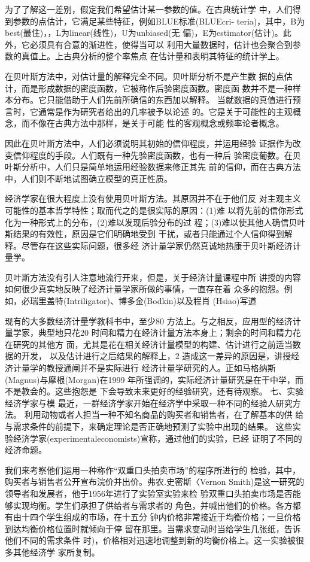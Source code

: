 为了了解这一差别，假定我们希望估计某一参数的值。在古典统计学
中，人们得到参数的点估计，它满足某些特征，例如BLUE标准(BLUEcri-
teria)，其中，B为best(最住)，，L为linear(线性)，U为unbiased(无
偏)，E为estimator(估计)。此外，它必须具有合意的渐进性，使得当可以
利用大量数据时，估计也会聚合到参数的真值上。上古典分析的整个率焦点
在估计量和表明其特征的统计学上。

在贝叶斯方法中，对估计量的解释完全不同。贝叶斯分析不是产生数
据的点估计，而是形成数据的密度函数，它被称作后验密度函数。密度函
数并不是一种样本分布。它只能借助于人们先前所确信的东西加以解释。
当就数据的真值进行预言时，它通常是作为研究者给出的几率被予以论述
的。它是关于可能性的主观概念，而不像在古典方法中那样，是关于可能
性的客观概念或频率论者概念。

因此在贝叶斯方法中，人们必须说明其初始的信仰程度，并运用经验
证据作为改变信仰程度的手段。人们既有一种先验密度函数，也有一种后
验密度葡数。在贝叶斯分析中，人们只是简单地运用经验数据来修正其先
前的信仰，而在古典方法中，人们则不断地试图确立模型的真正性质。

经济学家在很大程度上没有使用贝叶斯方法。其原因并不在于他们反
对主观主义可能性的基本哲学特性；取而代之的是很实际的原因：(1)难
以将先前的信你形式化为一种形式上的分布，(2)难以发现后验分布的过
程；(3)难以使其他人确信贝叶斯结果的有效性，原因是它们明确地受到
干扰，或者只能通过个人信仰得到解释。尽管存在这些实际问题，很多经
济计量学家仍然真诚地热康于贝叶斯经济计量学。

贝叶斯方法没有引人注意地流行开来，但是，关于经济计量课程中所
讲授的内容如何很少真实地反映了经济计量学家所做的事情，一直存在着
众多的抱怨。例如，必瑞里盖特(Intriligator)、博多金(Bodkin)以及程肖
(Hsiao)写道


现有的大多数经济计量学教科书中，至少80%
方法上。与之相反，应用型的经济计量学家，典型地只花20%
时间和精力在经济计量方法本身上；剩余的时间和精力花在研究的其他方
面，尤其是花在相关经济计量模型的构建、估计进行之前适当数据的开发，
以及估计进行之后结果的解释上，2
造成这一差异的原因是，讲授经济计量学的教授通闸并不是实际进行
经济计量学研究的人。正如马格纳斯(Magnus)与摩根(Morgan)在1999
年所强调的，实际经济计量研究是在干中学，而不是教会的。这些抱怨是
下会导致未来更好的经验研究，还有待观察。
七、实验经济学家与模
最近，一群经济学家开始在经济学中采取一种不同的经验人研究方法。
利用动物或者人担当一种不知名商品的购买者和销售者，在了解基本的供
给与需求条件的前提下，来确定理论是否正确地预测了实验中出现的结果。
这些实验经济学家(experimentaleconomists)宣称，通过他们的实验，已经
证明了不同的经济命题。

我们来考察他们运用一种称作“双重口头拍卖市场”的程序所进行的
检验，其中，购买者与销售者公开宣布浣价并出价。弗农.史密斯〈Vernon
Smith)是这一研究的领导者和发展者，他于1956年进行了实验室实验来检
验双重口头拍卖市场是否能够实现均衡。学生们承担了供给者与需求者的
角色，并喊出他们的价格。各方都有由十四个学生组成的市场，在十五分
钟内价格非常接近于均衡价格；一旦价格到达均衡价格位置时就倾向于停
留在那里。当需求变动时当给学生几张纸，告诉他们不同的需求条件
时)，价格相对迅速地调整到新的均衡价格上。这一实验被很多其他经济学
家所复制。

